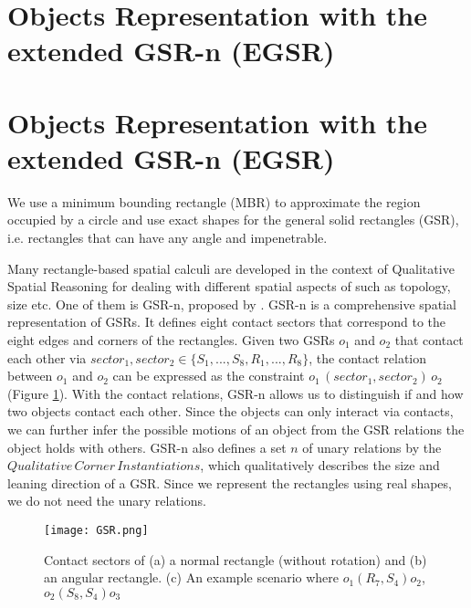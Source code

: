 \documentclass[letterpaper]{article}
\begin{document}
    

\section{Objects Representation with the extended GSR-n (EGSR)} 
\section{Objects Representation with the extended GSR-n (EGSR)} 

We use a minimum bounding rectangle (MBR) to approximate the region occupied by a circle and use exact shapes for the general solid rectangles (GSR), i.e. rectangles that can have any angle and impenetrable. 

Many rectangle-based spatial calculi \cite{balbiani1998model,cohn2012thinking,sokeh2013efficient} are developed in the context of Qualitative Spatial Reasoning \cite{cohn2001qualitative} for dealing with different spatial aspects of such as topology, size etc. One of them is GSR-n, proposed by \cite{Ge2013}. GSR-n is a comprehensive spatial representation of GSRs. It defines eight contact sectors that correspond to the eight edges and corners of the rectangles. Given two GSRs $o_1$ and $o_2$ that contact each other via $sector_1, sector_2 \in \{S_1, ..., S_8, R_1, ..., R_8\}$, the contact relation between $o_1$ and $o_2$ can be expressed as the constraint $o_1 \, (sector_1, sector_2) \, o_2$ (Figure \ref{GSR}). With the contact relations, GSR-n allows us to distinguish if and how two objects contact each other. Since the objects can only interact via contacts, we can further infer the possible motions of an object from the GSR relations the object holds with others. GSR-n also defines a set $n$ of unary relations by the $Qualitative\,Corner\,Instantiations$, which qualitatively describes the size and leaning direction of a GSR. Since we represent the rectangles using real shapes, we do not need the unary relations. 
\begin{figure}[h!]
\centering\texttt{[image: GSR.png]}\caption{Contact sectors of (a) a normal rectangle (without rotation) and (b) an angular rectangle. (c) An example scenario where $o_1 (R_7, S_4) o_2$, $o_2 (S_8, S_4) o_3$}
\label{GSR}
\end{figure}
\end{document}
